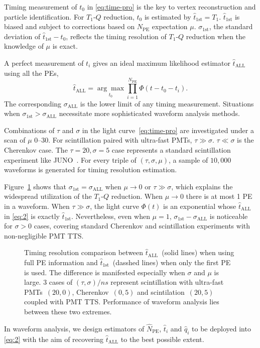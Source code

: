 Timing measurement of $t_0$ in \eqref{eq:time-pro} is the key to vertex reconstruction and particle identification.  For $T_1$-$Q$ reduction, $t_0$ is estimated by $\hat{t}_\mathrm{1st} = T_1$. $\hat{t}_\mathrm{1st}$ is biased and subject to corrections based on $N_\mathrm{PE}$ expectation $\mu$.  $\sigma_\mathrm{1st}$, the standard deviation of $\hat{t}_\mathrm{1st} - t_0$, reflects the timing resolution of $T_1$-$Q$ reduction when the knowledge of $\mu$ is exact.

A perfect measurement of $t_i$ gives an ideal maximum likelihood estimator $\hat{t}_\mathrm{ALL}$ using all the PEs,
\begin{equation}
  \label{eq:2}
  \hat{t}_\mathrm{ALL} = \underset{t_0}{\arg \max} \prod_{i=1}^{N_\mathrm{PE}} \Phi(t-t_0-t_i).
\end{equation}
The corresponding $\sigma_\mathrm{ALL}$ is the lower limit of any timing measurement.  Situations when $\sigma_\mathrm{1st} > \sigma_\mathrm{ALL}$ necessitate more sophisticated waveform analysis methods.

Combinations of $\tau$ and $\sigma$ in the light curve~\eqref{eq:time-pro} are investigated under a scan of $\mu$ \numrange{0}{30}. For scintillation paired with ultra-fast PMTs, $\tau \gg \sigma$.  $\tau \ll \sigma$ is the Cherenkov case.  The $\tau=20, \sigma=5$ case represents a standard scintillation experiment like JUNO~\cite{ludhova_particle_2020}.  For every triple of $(\tau, \sigma, \mu)$, a sample of $10,000$ waveforms is generated for timing resolution estimation.

Figure~\ref{fig:reso-diff} shows that $\sigma_{\mathrm{1st}}=\sigma_{\mathrm{ALL}}$ when $\mu \to 0$ or $\tau \gg \sigma$, which explains the widespread utilization of the $T_1$-$Q$ reduction.  When $\mu \to 0$ there is at most 1 PE in a waveform.  When $\tau \gg \sigma$, the light curve $\Phi(t)$ is an exponential whose $\hat{t}_\mathrm{ALL}$ in \eqref{eq:2} is exactly $\hat{t}_\mathrm{1st}$.  Nevertheless, even when $\mu = 1$, $\sigma_{\mathrm{1st}} - \sigma_{\mathrm{ALL}}$ is noticeable for $\sigma > 0$ cases, covering standard Cherenkov and scintillation experiments with non-negligible PMT TTS.
\begin{figure}[H]
  \centering
  \scalebox{0.5}{}
  \caption{\label{fig:reso-diff} Timing resolution comparison between $\hat{t}_{\mathrm{ALL}}$~(solid lines) when using full PE information and $\hat{t}_\mathrm{1st}$~(dasshed lines) when only the first PE is used.  The difference is manifested especially when $\sigma$ and $\mu$ is large.  3 cases of $(\tau, \sigma)/\si{ns}$ represent scintillation with ultra-fast PMTs~$(20,0)$, Cherenkov~$(0, 5)$ and scintilation~$(20, 5)$ coupled with PMT TTS. Performance of waveform analysis lies between these two extremes.}
\end{figure}

In waveform analysis, we design estimators of $\hat{N}_\mathrm{PE}$, $\hat{t}_i$ and $\hat{q}_i$ to be deployed into \eqref{eq:2} with the aim of recovering $\hat{t}_\mathrm{ALL}$ to the best possible extent.
